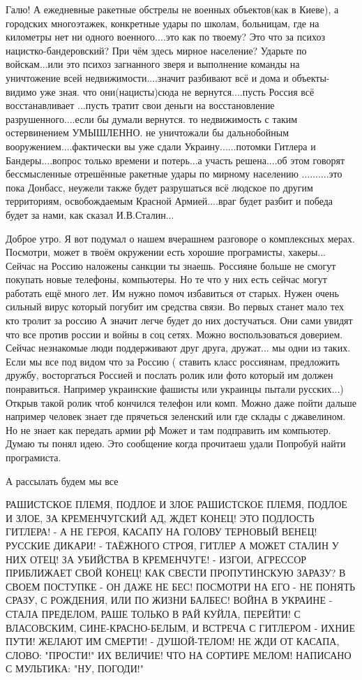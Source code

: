 Галю! А ежедневные ракетные обстрелы не военных объектов(как в Киеве), а городских многоэтажек, конкретные удары по школам, больницам, где на километры нет ни одного военного....это как по твоему? Это что за психоз нацистко-бандеровский? При чём здесь мирное население? Ударьте по войскам...или это психоз загнанного зверя и выполнение команды на уничтожение всей недвижимости....значит разбивают всё и дома и объекты-видимо уже зная. что они(нацисты)сюда не вернутся....пусть Россия всё восстанавливает ...пусть тратит свои деньги на восстановление разрушенного....если бы думали вернутся. то недвижимость с таким остервинением УМЫШЛЕННО. не уничтожали бы дальнобойным вооружением....фактически вы уже сдали Украину......потомки Гитлера и Бандеры....вопрос только времени и потерь...а участь решена....об этом говорят бессмысленные отрешённые ракетные удары по мирному населению ..........это пока Донбасс, неужели также будет разрушаться всё людское по другим территориям, освобождаемым Красной Армией....враг будет разбит и победа будет за нами, как сказал И.В.Сталин...

Доброе утро.
Я вот подумал о нашем вчерашнем разговоре о комплексных мерах.
Посмотри, может в твоём окружении есть хорошие програмисты, хакеры...
Сейчас на Россию наложены санкции ты знаешь.
Россияне больше не смогут покупать новые телефоны, компьютеры.  Но те что у них есть сейчас могут работать ещё много лет. Им нужно помоч избавиться от старых.
Нужен очень сильный вирус который погубит им средства связи.  Во первых станет мало тех кто тролит за россию
А значит легче будет до них достучаться. Они сами увидят что все против россии и войны в соц сетях.  Можно воспользоваться доверием. Сейчас незнакомые люди поддерживают друг друга, дружат... мы одни из таких.
Если мы все под видом что за Россию ( ставить класс россиянам, предложить дружбу, восторгаться Россией и послать ролик или фото который им должен понравиться. Например украинские фашисты или украинцы пытали русских...)
Открыв такой ролик чтоб кончился телефон или комп.
Можно даже пойти дальше например человек знает где прячеться зеленский или где склады с джавелином. Но не знает как передать армии рф
Может и там подправить им компьютер. Думаю ты понял идею.  Это сообщение когда прочитаеш удали
Попробуй найти програмиста.

А рассылать будем мы все

РАШИСТСКОЕ ПЛЕМЯ, ПОДЛОЕ И ЗЛОЕ
РАШИСТСКОЕ ПЛЕМЯ, ПОДЛОЕ И ЗЛОЕ,
ЗА КРЕМЕНЧУГСКИЙ АД, ЖДЕТ КОНЕЦ!
ЭТО ПОДЛОСТЬ ГИТЛЕРА! - А НЕ ГЕРОЯ,
КАСАПУ НА ГОЛОВУ ТЕРНОВЫЙ ВЕНЕЦ!
РУССКИЕ ДИКАРИ! - ТАЁЖНОГО СТРОЯ,
ГИТЛЕР А МОЖЕТ СТАЛИН У НИХ ОТЕЦ!
ЗА УБИЙСТВА В КРЕМЕНЧУГЕ! - ИЗГОИ,
АГРЕССОР ПРИБЛИЖАЕТ СВОЙ КОНЕЦ!
КАК СВЕСТИ ПРОПУТИНСКУЮ ЗАРАЗУ?
В СВОЕМ ПОСТУПКЕ - ОН ДАЖЕ НЕ БЕС!
ПОСМОТРИ НА ЕГО - НЕ ПОНЯТЬ СРАЗУ,
С РОЖДЕНИЯ, ИЛИ ПО ЖИЗНИ БАЛБЕС!
ВОЙНА В УКРАИНЕ - СТАЛА ПРЕДЕЛОМ,
РАШЕ ТОЛЬКО В РАЙ КУЙЛА, ПЕРЕЙТИ!
С ВЛАСОВСКИМ, СИНЕ-КРАСНО-БЕЛЫМ,
И ВСТРЕЧА С ГИТЛЕРОМ - ИХНИЕ ПУТИ!
ЖЕЛАЮТ ИМ СМЕРТИ! - ДУШОЙ-ТЕЛОМ!
НЕ ЖДИ ОТ КАСАПА, СЛОВО: "ПРОСТИ!"
ИХ ВЕЛИЧИЕ! ЧТО НА СОРТИРЕ МЕЛОМ!
НАПИСАНО С МУЛЬТИКА: "НУ, ПОГОДИ!"

